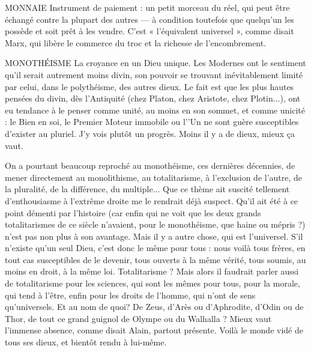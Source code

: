 MONNAIE Instrument de paiement : un petit morceau du réel, qui peut
être échangé contre la plupart des autres — à condition toutefois
que quelqu'un les possède et soit prêt à les vendre. C’est « l'équivalent
universel », comme disait Marx, qui libère le commerce du troc et la richesse de
l'encombrement.

MONOTHÉISME La croyance en un Dieu unique. Les Modernes ont le sentiment
qu’il serait autrement moins divin, son pouvoir se
trouvant inévitablement limité par celui, dans le polythéisme, des autres dieux.
Le fait est que les plus hautes pensées du divin, dès l’Antiquité (chez Platon,
chez Aristote, chez Plotin...), ont eu tendance à le penser comme unité, au
moins en son sommet, et comme unicité : le Bien en soi, le Premier Moteur
immobile ou l’'Un ne sont guère susceptibles d’exister au pluriel. J'y vois plutôt
un progrès. Moins il y a de dieux, mieux ça vaut.

On a pourtant beaucoup reproché au monothéisme, ces dernières décennies,
de mener directement au monolithisme, au totalitarisme, à l'exclusion de
l’autre, de la pluralité, de la différence, du multiple... Que ce thème ait suscité
tellement d’enthousiasme à l’extrême droite me le rendrait déjà suspect. Qu'il
ait été à ce point démenti par l’histoire (car enfin qui ne voit que les deux
grands totalitarismes de ce siècle n’avaient, pour le monothéisme, que haine ou
mépris ?) n’est pas non plus à son avantage. Mais il y a autre chose, qui est
l’universel. S’il n’existe qu’un seul Dieu, c’est donc le même pour tous : nous
voilà tous frères, en tout cas susceptibles de le devenir, tous ouverts à la même
vérité, tous soumis, au moins en droit, à la même loi. Totalitarisme ? Mais alors
il faudrait parler aussi de totalitarisme pour les sciences, qui sont les mêmes
pour tous, pour la morale, qui tend à l’être, enfin pour les droits de l’homme,
qui n’ont de sens qu’universels. Et au nom de quoi? De Zeus, d’Arès ou
d’Aphrodite, d’Odin ou de Thor, de tout ce grand guignol de Olympe ou du
Walhalla ? Mieux vaut l'immense absence, comme disait Alain, partout présente.
Voilà le monde vidé de tous ses dieux, et bientôt rendu à lui-même.

